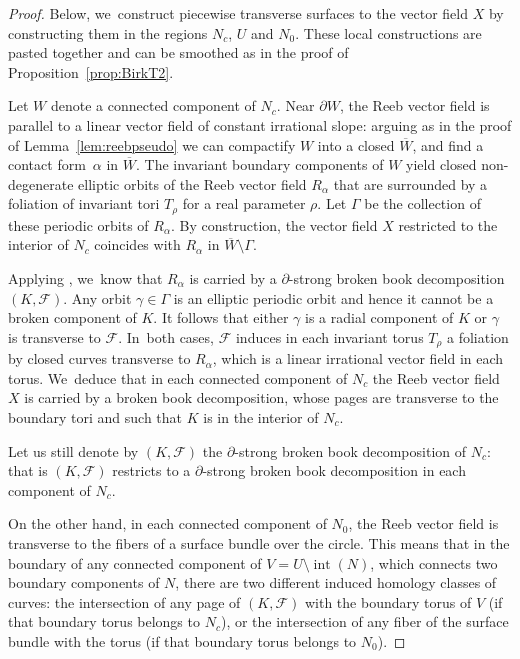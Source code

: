 \begin{proof}
Below, we~construct piecewise transverse surfaces to the vector field $X$ by constructing them in the regions $N_c$, $U$ and $N_0$. These local constructions are pasted together and can be smoothed as in the proof of Proposition~\ref{prop:BirkT2}.

Let $W$ denote a connected component of $N_c$. Near $\partial W$, the Reeb vector field is parallel to a linear vector field of constant irrational slope: arguing as in the proof of Lemma~\ref{lem:reebpseudo} we can compactify $W$ into a closed \threemanifold $\overline W$, and find a contact form~$\alpha$ in $\overline W$. The invariant boundary components of $W$ yield closed non-degenerate elliptic orbits of the Reeb vector field $R_\alpha$ that are surrounded by a foliation of invariant tori $T_\rho$ for a real parameter $\rho$. Let $\Gamma$ be the collection of these periodic orbits of $R_\alpha$.
By construction, the vector field $X$ restricted to the interior of $N_c$ coincides with $R_\alpha$ in $\overline W \setminus \Gamma$.

Applying \cite[Th.\,1.1]{CDR}, we~know that $R_\alpha$ is carried by a $\partial$-strong broken book decomposition $(K,\mathcal{F})$. Any orbit $\gamma \in \Gamma$ is an elliptic periodic orbit and hence it cannot be a broken component of $K$. It follows that either $\gamma$ is a radial component of $K$ or $\gamma$ is transverse to $\mathcal{F}$. In~both cases, $\mathcal{F}$ induces in each invariant torus $T_\rho$ a foliation by closed curves transverse to $R_\alpha$, which is a linear irrational vector field in each torus. We~deduce that in each connected component of $N_c$ the Reeb vector field $X$ is carried by a broken book decomposition, whose pages are transverse to the boundary tori and such that $K$ is in the interior of $N_c$.

Let us still denote by $(K,\mathcal{F})$ the $\partial$-strong broken book decomposition of $N_c$: that is $(K,\mathcal{F})$ restricts to a $\partial$-strong broken book decomposition in each component of $N_c$.

On the other hand, in each connected component of $N_0$, the Reeb vector field is transverse to the fibers of a surface bundle over the circle. This means that in the boundary of any connected component of $V={U\setminus \operatorname{int}(N)}$, which connects two boundary components of $N$, there are two different induced homology classes of curves: the intersection of any page of $(K,\mathcal{F})$ with the boundary torus of $V$ (if that boundary torus belongs to $N_c$), or the intersection of any fiber of the surface bundle with the torus (if that boundary torus belongs to $N_0$).\enlargethispage{.5\baselineskip}%


\end{proof}
